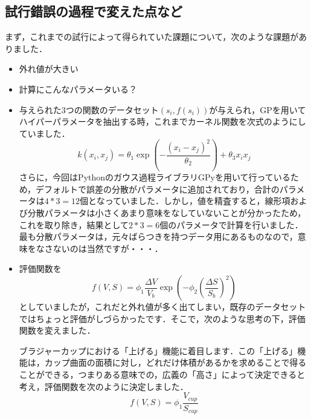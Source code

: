 \documentclass[11pt]{jsarticle}
\begin{document}
		\subsection{試行錯誤の過程で変えた点など}
			まず，これまでの試行によって得られていた課題について，次のような課題がありました．
			\begin{itemize}
				\item 外れ値が大きい
				\item 計算にこんなパラメータいる？
			\end{itemize}
			\begin{itemize}
				\item 与えられた3つの関数のデータセット$ (s_i,f(s_i)) $が与えられ，GPを用いてハイパーパラメータを抽出する時，これまでカーネル関数を次式のようにしていました．
				\begin{equation}\label{eq:RBFLinear}
				k(x_i,x_j) = \theta_1 \exp \left( -\frac{(x_i-x_j)^2}{\theta_2} \right) + \theta_3 x_i x_j
				\end{equation}
				さらに，今回はPythonのガウス過程ライブラリGPyを用いて行っているため，デフォルトで誤差の分散がパラメータに追加されており，合計のパラメータは$ 4*3=12 $個となっていました．しかし，値を精査すると，線形項および分散パラメータは小さくあまり意味をなしていないことが分かったため，これを取り除き，結果として$ 2*3=6 $個のパラメータで計算を行いました．最も分散パラメータは，元々ばらつきを持つデータ用にあるものなので，意味をなさないのは当然ですが・・・．
				\item 評価関数を
				\begin{equation}\label{eq:EvalFunc}
				f(V,S) = \phi_1 \frac{\Delta V}{V_b} \exp \left(-\phi_2 \left(\frac{\Delta S}{S_b}\right)^2 \right)
				\end{equation}
				としていましたが，これだと外れ値が多く出てしまい，既存のデータセットではちょっと評価がしづらかったです．そこで，次のような思考の下，評価関数を変えました．
				
				ブラジャーカップにおける「上げる」機能に着目します．この「上げる」機能は，カップ曲面の面積に対し，どれだけ体積があるかを求めることで得ることができる，つまりある意味での，広義の「高さ」によって決定できると考え，評価関数を次のように決定しました．
				\begin{equation}\label{eq:EvalFunc2}
				f(V,S) = \phi_1 \frac{V_{cup}}{S_{cup}}
				\end{equation}
			\end{itemize}
\end{document}
